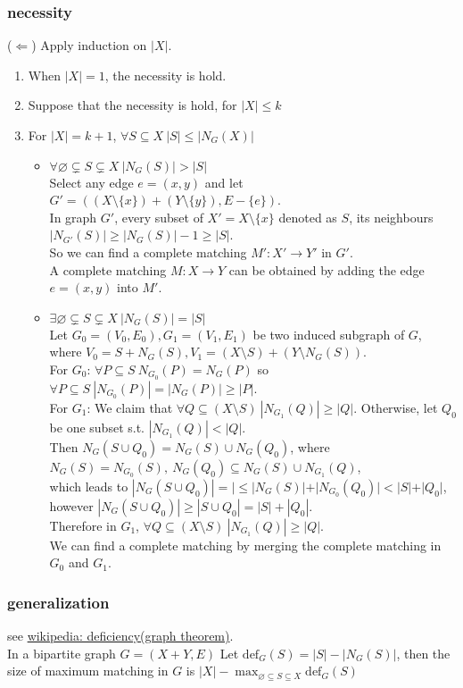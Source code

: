 \documentclass{article}
\begin{document}
\subsubsection{necessity}
($\Leftarrow$)\quad
Apply induction on $|X|$.
\begin{enumerate}
	\item When $|X|=1$, the necessity is hold.
	\item Suppose that the necessity is hold, for $|X|\leq k$
	\item For $|X|=k+1$, $\forall S\subseteq X\ |S|\leq |N_G(X)|$
	      \begin{itemize}
		      \item $\forall \varnothing\subsetneq S\subsetneq X\ |N_G(S)|>|S|$\\
						Select any edge $e=(x,y)$ and let $G'=((X\setminus\{x\})+(Y\setminus\{y\}),E-\{e\})$.\\
		            In graph $G'$, every subset of $X'=X\setminus \{x\}$ denoted as $S$, its neighbours $|N_{G'}(S)|\geq |N_{G}(S)|-1\geq |S|$.\\
		            So we can find a complete matching  $M':X'\to Y'$ in $G'$.\\
		            A complete matching $M:X\to Y$ can be obtained by adding the edge $e=(x,y)$ into $M'$.
		      \item $\exists \varnothing\subsetneq S\subsetneq X\ |N_G(S)|=|S|$\\
						Let $G_0=(V_0,E_0),G_1=(V_1,E_1)$ be two induced subgraph of $G$, where $V_0=S+N_G(S),V_1=(X\setminus S)+ (Y\setminus N_G(S))$.\\
		            For $G_0$: $\forall P\subseteq S\ N_{G_0}(P)=N_{G}(P)$ so $\forall P\subseteq S\ |N_{G_0}(P)|=|N_{G}(P)|\geq |P|$.\\
								For $G_1$: We claim that $\forall Q\subseteq (X\setminus S)\ |N_{G_1}(Q)|\geq |Q|$.
								Otherwise, let $Q_0$ be one subset s.t. $|N_{G_1}(Q)|<|Q|$.\\
								Then $N_{G}(S\cup Q_0)=N_{G}(S)\cup N_{G}(Q_0)$, where $N_{G}(S)=N_{G_0}(S),\ N_{G}(Q_0)\subseteq N_{G}(S)\cup N_{G_1}(Q)$,\\
								which leads to $|N_{G}(S\cup Q_0)|=|\leq |N_G(S)|+|N_{G_0}(Q_0)| < |S|+|Q_0|$, however $|N_{G}(S\cup Q_0)|\geq |S\cup Q_0|=|S|+|Q_0|$.\\
								Therefore in $G_1$, $\forall Q\subseteq (X\setminus S)\ |N_{G_1}(Q)|\geq |Q|$.\\
								We can find a complete matching by merging the complete matching in $G_0$ and $G_1$.
	      \end{itemize}
\end{enumerate}

\subsubsection{generalization}

see \href{https://en.wikipedia.org/wiki/Deficiency\_(graph\_theory)}{wikipedia: deficiency(graph theorem)}.\\
In a bipartite graph $G=(X+Y,E)$
Let $\mathrm{def}_G(S)=|S|-|N_G(S)|$, then the size of maximum matching in $G$ is $|X|-\max_{\varnothing\subseteq S\subseteq X}\mathrm{def}_G(S)$

\newpage
\end{document}
